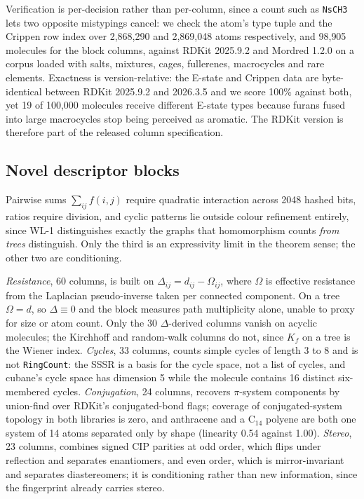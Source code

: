 Verification is per-decision rather than per-column, since a count such as \texttt{NsCH3} lets
two opposite mistypings cancel: we check the atom's type tuple and the Crippen row index over
2{,}868{,}290 and 2{,}869{,}048 atoms respectively, and 98{,}905 molecules for the block
columns, against RDKit 2025.9.2 and Mordred 1.2.0 on a corpus loaded with salts, mixtures,
cages, fullerenes, macrocycles and rare elements. Exactness is version-relative: the E-state and
Crippen data are byte-identical between RDKit 2025.9.2 and 2026.3.5 and we score 100\% against
both, yet 19 of 100{,}000 molecules receive different E-state types because furans fused into
large macrocycles stop being perceived as aromatic. The RDKit version is therefore part of the
released column specification.

\subsection{Novel descriptor blocks}

Pairwise sums $\sum_{ij} f(i,j)$ require quadratic interaction across 2048 hashed bits, ratios
require division, and cyclic patterns lie outside colour refinement entirely, since WL-1
distinguishes exactly the graphs that homomorphism counts \emph{from trees} distinguish. Only
the third is an expressivity limit in the theorem sense; the other two are conditioning.

\emph{Resistance}, 60 columns, is built on $\Delta_{ij} = d_{ij} - \Omega_{ij}$, where $\Omega$
is effective resistance from the Laplacian pseudo-inverse taken per connected component. On a
tree $\Omega = d$, so $\Delta \equiv 0$ and the block measures path multiplicity alone, unable
to proxy for size or atom count. Only the 30 $\Delta$-derived columns vanish on acyclic
molecules; the Kirchhoff and random-walk columns do not, since $K_f$ on a tree is the Wiener
index. \emph{Cycles}, 33 columns, counts simple cycles of length 3 to 8 and is not
\texttt{RingCount}: the SSSR is a basis for the cycle space, not a list of cycles, and cubane's
cycle space has dimension 5 while the molecule contains 16 distinct six-membered cycles.
\emph{Conjugation}, 24 columns, recovers $\pi$-system components by union-find over RDKit's
conjugated-bond flags; coverage of conjugated-system topology in both libraries is zero, and
anthracene and a C$_{14}$ polyene are both one system of 14 atoms separated only by shape
(linearity 0.54 against 1.00). \emph{Stereo}, 23 columns, combines signed CIP parities at odd
order, which flips under reflection and separates enantiomers, and even order, which is
mirror-invariant and separates diastereomers; it is conditioning rather than new information,
since the fingerprint already carries stereo.

